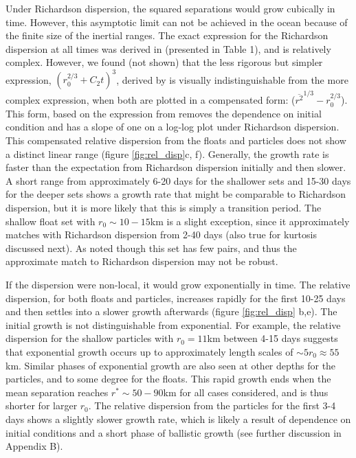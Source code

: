 \documentclass[]{ametsoc}
\begin{document}
Under Richardson dispersion, the squared separations would grow cubically in time. However, this asymptotic limit can not be achieved in the ocean because of the finite size of the inertial ranges. The exact expression for the Richardson dispersion at all times was derived in \citet{graff2015relative} (presented in Table 1), and is relatively complex. However, we found (not shown) that the less rigorous but simpler expression, $(r_0^{2/3} + C_2t)^3$, derived by \citet{ollitrault2005open} is visually indistinguishable from the more complex expression, when both are plotted in a compensated form: ($\overline{r^2}^{1/3} - r_0^{2/3}$). This form, based on the expression from \citet{ollitrault2005open} removes the dependence on initial condition and has a slope of one on a log-log plot under Richardson dispersion. 
This compensated relative dispersion from the floats and particles does not show a distinct linear range (figure \ref{fig:rel_disp}c, f). Generally, the growth rate is faster than the expectation from Richardson dispersion initially and then slower. A short range from approximately 6-20 days for the shallower sets and 15-30 days for the deeper sets shows a growth rate that might be comparable to Richardson dispersion, but it is more likely that this is simply a transition period. The shallow float set with $r_0 \sim 10-15$km is a slight exception, since it approximately matches with Richardson dispersion from 2-40 days (also true for kurtosis discussed next). As noted though this set has few pairs, and thus the approximate match to Richardson dispersion may not be robust. 

If the dispersion were non-local, it would grow exponentially in time. The relative dispersion, for both floats and particles, increases rapidly for the first 10-25 days and then settles into a slower growth afterwards (figure \ref{fig:rel_disp} b,e). The initial growth is not distinguishable from exponential. For example, the relative dispersion for the shallow particles with $r_0=11$km between 4-15 days suggests that exponential growth occurs up to approximately length scales of  $\sim 5r_0 \approx 55$km. Similar phases of exponential growth are also seen at other depths for the particles, and to some degree for the floats. This rapid growth ends when the mean separation reaches $r^*\sim 50-90$km for all cases considered, and is thus shorter for larger $r_0$. The relative dispersion from the particles for the first 3-4 days shows a slightly slower growth rate, which is likely a result of dependence on initial conditions and a short phase of ballistic growth (see further discussion in Appendix B).
\end{document}
